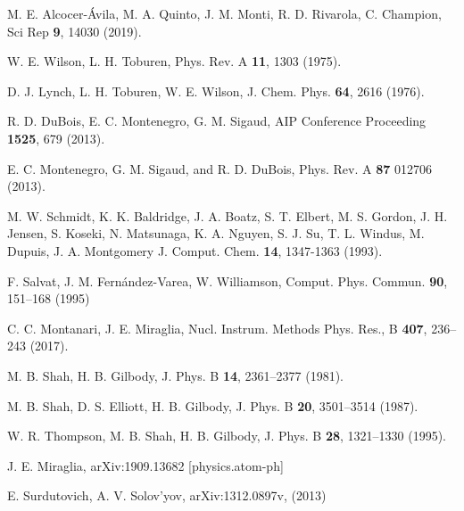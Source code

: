 \begin{thebibliography}{9}
M. E. Alcocer-Ávila, M. A. Quinto, J. M. Monti, R. D. Rivarola, C. Champion,
Sci Rep \textbf{9}, 14030 (2019). 

W. E. Wilson, L. H. Toburen,
Phys. Rev. A \textbf{11}, 1303 (1975).

D. J. Lynch, L. H. Toburen, W. E. Wilson,
J. Chem. Phys. \textbf{64}, 2616 (1976).

R. D. DuBois, E. C. Montenegro, G. M. Sigaud,
AIP Conference Proceeding \textbf{1525}, 679 (2013).

E. C. Montenegro, G. M. Sigaud, and R. D. DuBois, 
Phys. Rev. A \textbf{87} 012706 (2013).

M. W. Schmidt, K. K. Baldridge, J. A. Boatz, S. T. Elbert, M. S. Gordon, 
J. H. Jensen, S. Koseki, N. Matsunaga, K. A. Nguyen, S. J. Su, T. L. Windus, 
M. Dupuis, J. A. Montgomery 
J. Comput. Chem. \textbf{14}, 1347-1363 (1993).

F. Salvat, J. M. Fern\'andez-Varea, W. Williamson,
Comput. Phys. Commun. \textbf{90}, 151--168 (1995)

C. C. Montanari, J. E. Miraglia,
Nucl. Instrum. Methods Phys. Res., B \textbf{407}, 236--243 (2017).

M. B. Shah, H. B. Gilbody,
J. Phys. B \textbf{14}, 2361--2377 (1981).

M. B. Shah, D. S. Elliott, H. B. Gilbody,
J. Phys. B \textbf{20}, 3501--3514 (1987).

W. R. Thompson, M. B. Shah, H. B. Gilbody,
J. Phys. B \textbf{28}, 1321--1330 (1995).

J. E. Miraglia,
arXiv:1909.13682 [physics.atom-ph]

E. Surdutovich, A. V. Solov'yov, 
arXiv:1312.0897v, (2013)


\end{thebibliography}
